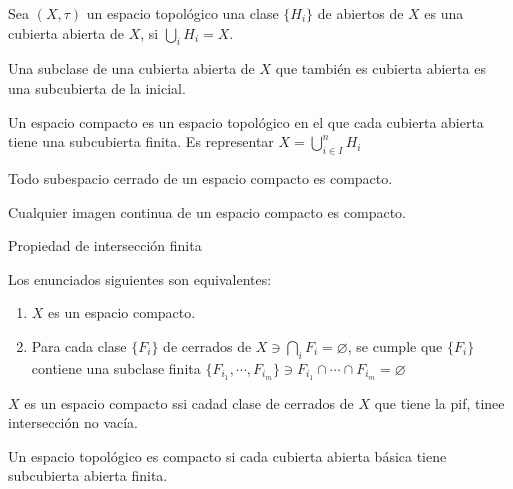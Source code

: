 \begin{definicion}
    Sea $(X,\tau)$ un espacio topológico una clase $\{H_i\}$ de abiertos de $X$ es una cubierta abierta de $X$, si $\bigcup_i H_i=X$. 
\end{definicion}

\begin{definicion}
    Una subclase de una cubierta abierta de $X$ que también es cubierta abierta es una subcubierta de la inicial. 
\end{definicion}

\begin{definicion}
    Un espacio compacto es un espacio topológico en el que cada cubierta abierta tiene una subcubierta finita. Es representar $X=\bigcup_{i\in I}^n H_i $
\end{definicion}


\begin{teorema}
    Todo subespacio cerrado de un espacio compacto es compacto.
    
\end{teorema}

\begin{teorema}
    Cualquier imagen continua de un espacio compacto es compacto. 
    
\end{teorema}

\begin{prop}
    Propiedad de intersección finita 
\end{prop}

\begin{teorema}
    Los enunciados siguientes son equivalentes: 
    \begin{enumerate}
        \item $X$ es un espacio compacto. 
        \item Para cada clase $\{F_i\}$ de cerrados de $X\ni \bigcap_{i}F_i=\varnothing$, se cumple que $\{F_i\}$ contiene una subclase finita $\{F_{i_1}, \cdots, F_{i_m}\}\ni F_{i_1}\cap \cdots \cap F_{i_m}=\varnothing$  
    \end{enumerate}
\end{teorema}


\begin{teorema}
    $X$ es un espacio compacto ssi cadad clase de cerrados de $X$ que tiene la pif, tinee intersección no vacía. 
\end{teorema}


\begin{teorema}
    Un espacio topológico es compacto si cada cubierta abierta básica tiene subcubierta abierta finita. 
    
\end{teorema}

